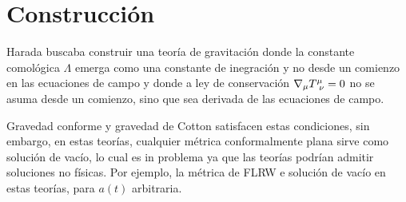 \section{Construcción}
Harada buscaba construir una teoría de gravitación donde la constante comológica $\Lambda$ emerga como una constante de inegración y no desde un comienzo en las ecuaciones de campo y donde a ley de conservación $\nabla_\mu T^\mu _{~\nu} =0$ no se asuma desde un comienzo, sino que sea derivada de las ecuaciones de campo.

Gravedad conforme y gravedad de Cotton satisfacen estas condiciones, sin embargo, en estas teorías, cualquier métrica conformalmente plana sirve como solución de vacío, lo cual es in problema ya que las teorías podrían admitir soluciones no físicas. Por ejemplo, la métrica de FLRW e solución de vacío en estas teorías, para $a(t)$ arbitraria.

